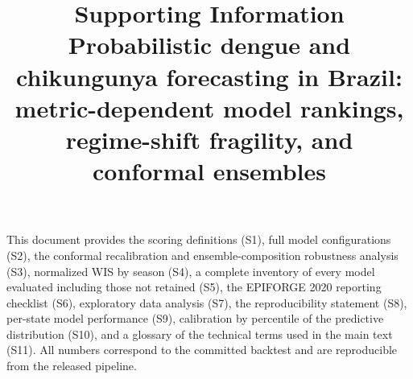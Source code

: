 \documentclass[11pt]{article}
\title{\textbf{Supporting Information}\\[0.3em]
Probabilistic dengue and chikungunya forecasting in Brazil:\\
metric-dependent model rankings, regime-shift fragility, and conformal ensembles}
\date{}
\begin{document}
\maketitle
\vspace{-2em}

\noindent This document provides the scoring definitions (S1), full model configurations (S2), the
conformal recalibration and ensemble-composition robustness analysis (S3), normalized WIS by season
(S4), a complete inventory of every model evaluated including those not retained (S5), the
EPIFORGE 2020 reporting checklist (S6), exploratory data analysis (S7), the reproducibility
statement (S8), per-state model performance (S9), calibration by percentile of the predictive
distribution (S10), and a glossary of the technical terms used in the main text (S11).
All numbers correspond to the committed backtest and are reproducible from the released pipeline.
\end{document}
